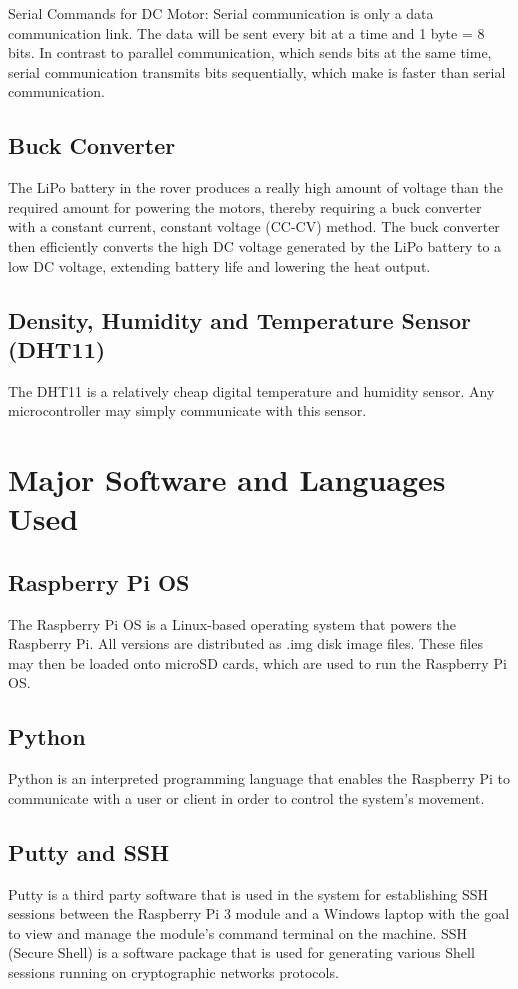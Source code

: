 \documentclass[conference,a4paper]{IEEEtran}
\begin{document}
Serial Commands for DC Motor: Serial communication is only a data communication link. The data will be sent every bit at a time and 1 byte = 8 bits. In contrast to parallel communication, which sends bits at the same time, serial communication transmits bits sequentially, which make is faster than serial communication.

\subsection{Buck Converter}
The LiPo battery in the rover produces a really high amount of voltage than the required amount for powering the motors, thereby requiring a buck converter with a constant current, constant voltage (CC-CV) method. The buck converter then efficiently converts the high DC voltage generated by the LiPo battery to a low DC voltage, extending battery life and lowering the heat output.
\cite{18}
\subsection{Density, Humidity and Temperature Sensor (DHT11)}
The DHT11 is a relatively cheap digital temperature and humidity sensor. Any microcontroller may simply communicate with this sensor.
\section{Major Software and Languages Used}
\subsection{Raspberry Pi OS}
The Raspberry Pi OS is a Linux-based operating system that powers the Raspberry Pi. All versions are distributed as .img disk image files. These files may then be loaded onto microSD cards, which are used to run the Raspberry Pi OS.
\subsection{Python}
Python is an interpreted programming language that enables the Raspberry Pi to communicate with a user or client in order to control the system's movement.
\subsection{Putty and SSH} 
Putty is a third party software that is used in the system for establishing SSH sessions between the Raspberry Pi 3 module and a Windows laptop with the goal to view and manage the module's command terminal on the machine. \cite{6} SSH (Secure Shell) is a software package that is used for generating various Shell sessions running on cryptographic networks protocols.
\end{document}
